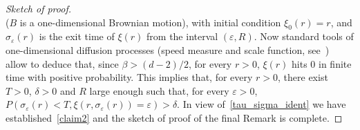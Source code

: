 \documentclass[a4paper,10pt]{article}
\newcommand\1{\mathbbm{1}}
\newcommand{\eps}{\varepsilon}
\numberwithin{equation}{section}
\begin{document}
\begin{proof}[Sketch of proof]
\begin{equation*}
\end{equation*}
($B$ is a one-dimensional Brownian motion), with initial condition $\xi_0(r)=r$, and $\sigma_\eps(r)$ is the exit time of $\xi(r)$ from the interval $(\eps,R)$. Now standard tools of one-dimensional diffusion processes (speed measure and scale function, see~\cite[Chapter~16]{BREIMAN}) allow to deduce that, since $\beta>(d-2)/2$, for every $r>0$, $\xi(r)$ hits $0$ in finite time with positive probability. This implies that, for every $r>0$, there exist $T>0$, $\delta>0$ and $R$ large enough such that, for every $\eps>0$, $P(\sigma_\eps(r)<T,\xi(r,\sigma_\eps(r))=\eps)>\delta$. In view of~\eqref{tau_sigma_ident} we have established~\eqref{claim2} and the sketch of proof of the final Remark is complete.
\end{proof}

\footnotesize
\end{document}
